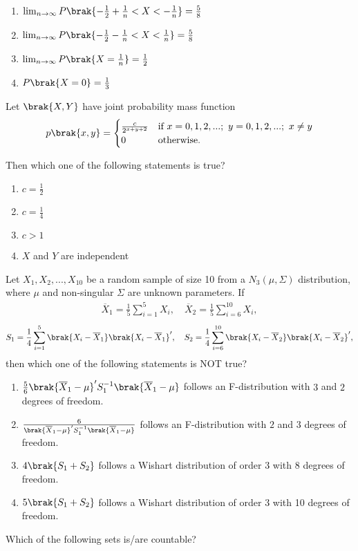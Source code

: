\begin{enumerate}
\item $\lim_{n \to \infty} P\brak{-\frac{1}{2} + \frac{1}{n} < X < -\frac{1}{n}} = \frac{5}{8}$
\item $\lim_{n \to \infty} P\brak{-\frac{1}{2} - \frac{1}{n} < X < \frac{1}{n}} = \frac{5}{8}$
\item $\lim_{n \to \infty} P\brak{X = \frac{1}{n}} = \frac{1}{2}$
\item $P\brak{X = 0} = \frac{1}{3}$\\
\end{enumerate}
\item Let $\brak{X,Y}$ have joint probability mass function
\begin{align}p\brak{x,y} = \begin{cases}
    \frac{c}{2^{x+y+2}} & \text{if } x = 0, 1, 2, ...; \ y = 0, 1, 2, ...; \ x \neq y \\
    0 & \text{otherwise.}
\end{cases}\end{align}

Then which one of the following statements is true?

\begin{enumerate}
\item $c = \frac{1}{2}$
\item $c = \frac{1}{4}$
\item $c > 1$
\item $X$ and $Y$ are independent
\end{enumerate}
\item Let $X_1, X_2, ..., X_{10}$ be a random sample of size 10 from a $N_3(\mu, \Sigma)$ distribution, where $\mu$ and non-singular $\Sigma$ are unknown parameters. If 
\begin{align}\overline{X}_1 = \frac{1}{5}\sum_{i=1}^{5}X_i, \quad \overline{X}_2 = \frac{1}{5}\sum_{i=6}^{10}X_i,\end{align}
\begin{align}S_1 = \frac{1}{4}\sum_{i=1}^{5}\brak{X_i - \overline{X}_1}\brak{X_i - \overline{X}_1}^\prime, \quad S_2 = \frac{1}{4}\sum_{i=6}^{10}\brak{X_i - \overline{X}_2}\brak{X_i - \overline{X}_2}^\prime,\end{align}
then which one of the following statements is NOT true?

\begin{enumerate}
\item $\frac{5}{6}\brak{\overline{X}_1 - \mu}^\prime S_1^{-1}\brak{\overline{X}_1 - \mu}$ follows an F-distribution with $3$ and $2$ degrees of freedom.\\
\item  $\frac{6}{\brak{\overline{X}_1 - \mu}^\prime S_1^{-1}\brak{\overline{X}_1 - \mu}}$ follows an F-distribution with $2$ and $3$ degrees of freedom.\\
\item $4\brak{S_1 + S_2}$ follows a Wishart distribution of order 3 with 8 degrees of freedom.
\item $5\brak{S_1 + S_2}$ follows a Wishart distribution of order 3 with 10 degrees of freedom.
\end{enumerate}  
\item  Which of the following sets is/are countable?

